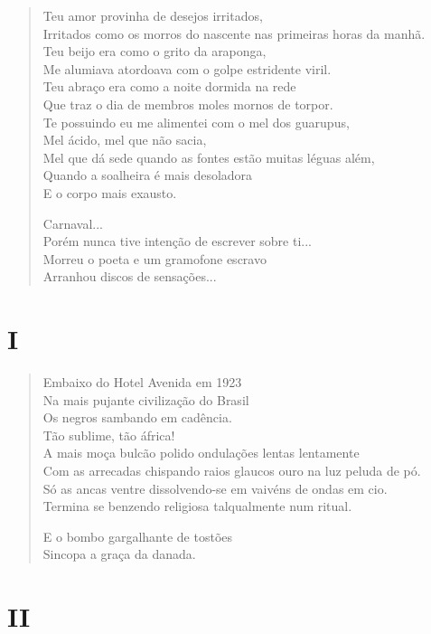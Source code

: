 \begin{verse}
Teu amor provinha de desejos irritados,\\
Irritados como os morros do nascente nas primeiras horas da manhã.\\
Teu beijo era como o grito da araponga,\\
Me alumiava atordoava com o golpe estridente viril.\\
Teu abraço era como a noite dormida na rede\\
Que traz o dia de membros moles mornos de torpor.\\
Te possuindo eu me alimentei com o mel dos guarupus,\\
Mel ácido, mel que não sacia,\\
Mel que dá sede quando as fontes estão muitas léguas além,\\
Quando a soalheira é mais desoladora\\
E o corpo mais exausto.

Carnaval...\\
Porém nunca tive intenção de escrever sobre ti...\\
Morreu o poeta e um gramofone escravo\\
Arranhou discos de sensações...
\end{verse}

\medskip
\section{I}

\begin{verse}
Embaixo do Hotel Avenida em 1923\\
Na mais pujante civilização do Brasil\\
Os negros sambando em cadência.\\
Tão sublime, tão áfrica!\\
A mais moça bulcão polido ondulações lentas lentamente\\
Com as arrecadas chispando raios glaucos ouro na luz peluda de pó.\\
Só as ancas ventre dissolvendo-se em vaivéns de ondas em cio.\\
Termina se benzendo religiosa talqualmente num ritual.

E o bombo gargalhante de tostões\\
Sincopa a graça da danada.
\end{verse}

\medskip
\section{II}

